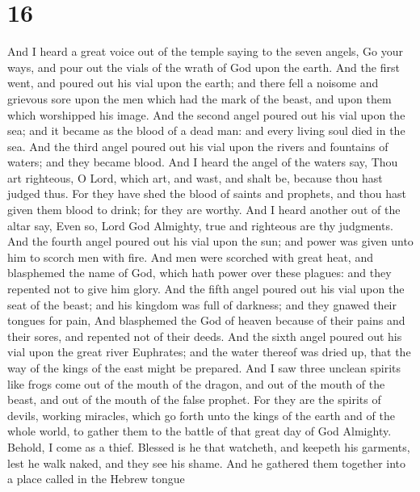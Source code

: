 \hypertarget{section-15}{%
\section{16}\label{section-15}}

 And I heard a great voice out of the temple saying to the
seven angels, Go your ways, and pour out the vials of the wrath of God
upon the earth.  And the first went, and poured out his
vial upon the earth; and there fell a noisome and grievous sore upon the
men which had the mark of the beast, and upon them which worshipped his
image.  And the second angel poured out his vial upon the
sea; and it became as the blood of a dead man: and every living soul
died in the sea.  And the third angel poured out his vial
upon the rivers and fountains of waters; and they became blood.
 And I heard the angel of the waters say, Thou art
righteous, O Lord, which art, and wast, and shalt be, because thou hast
judged thus.  For they have shed the blood of saints and
prophets, and thou hast given them blood to drink; for they are worthy.
 And I heard another out of the altar say, Even so, Lord
God Almighty, true and righteous are thy judgments.  And
the fourth angel poured out his vial upon the sun; and power was given
unto him to scorch men with fire.  And men were scorched
with great heat, and blasphemed the name of God, which hath power over
these plagues: and they repented not to give him glory. 
And the fifth angel poured out his vial upon the seat of the beast; and
his kingdom was full of darkness; and they gnawed their tongues for
pain,  And blasphemed the God of heaven because of their
pains and their sores, and repented not of their deeds. 
And the sixth angel poured out his vial upon the great river Euphrates;
and the water thereof was dried up, that the way of the kings of the
east might be prepared.  And I saw three unclean spirits
like frogs come out of the mouth of the dragon, and out of the mouth of
the beast, and out of the mouth of the false prophet. 
For they are the spirits of devils, working miracles, which go forth
unto the kings of the earth and of the whole world, to gather them to
the battle of that great day of God Almighty.  Behold, I
come as a thief. Blessed is he that watcheth, and keepeth his garments,
lest he walk naked, and they see his shame.  And he
gathered them together into a place called in the Hebrew tongue
